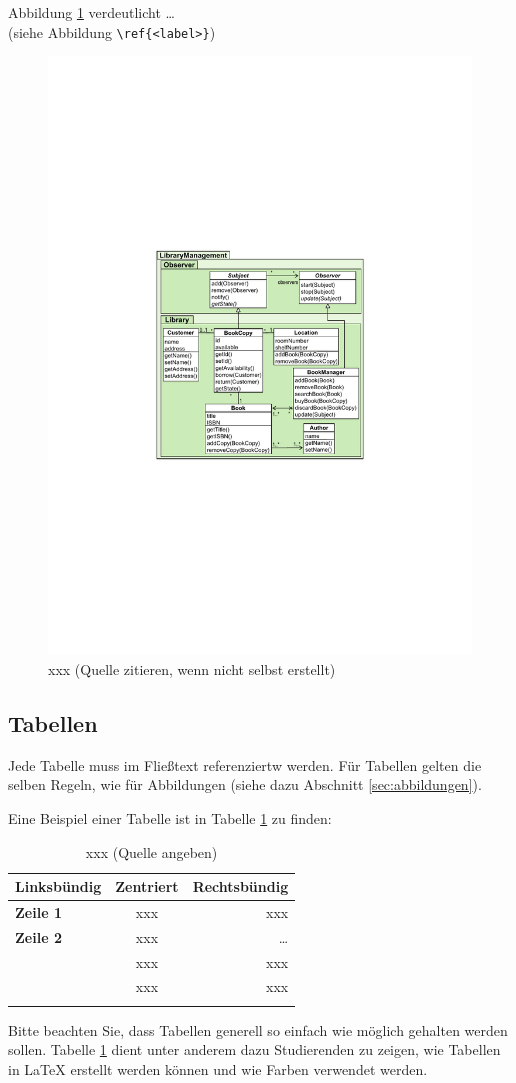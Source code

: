 Abbildung \ref{fig:xxx} verdeutlicht  \dots\\
(siehe Abbildung \verb|\ref{<label>}|)

\begin{figure}
	\centering
	\includegraphics[width=0.4\linewidth]{figures/figure1}
	\caption{xxx (Quelle zitieren, wenn nicht selbst erstellt)}
	\label{fig:xxx}
\end{figure}

\subsection{Tabellen}

Jede Tabelle muss im Fließtext referenziertw werden. Für Tabellen gelten die selben Regeln, wie für Abbildungen (siehe dazu Abschnitt \ref{sec:abbildungen}).

Eine Beispiel einer Tabelle ist in Tabelle \ref{tab:xxx} zu finden:
\begin{table}
	\centering
	\begin{tabular}{| >{\bfseries}l | c | r | }
		\hline
			\rowcolor{orange} \bfseries Linksbündig & \bfseries Zentriert & \bfseries Rechtsbündig \\
		\hline
		\hline
			Zeile 1 & xxx & xxx \\\hline
			Zeile 2 & xxx & \dots \\\hline
			\multirow{2}{*}{Zeile3}
			& xxx & xxx \\\cline{2-3}
			& xxx & xxx \\\hline
		\hline
			\multicolumn{3}{| c |}{xxx} \\\hline
	\end{tabular}
	\caption{xxx (Quelle angeben)}
	\label{tab:xxx}
\end{table}

Bitte beachten Sie, dass Tabellen generell so einfach wie möglich gehalten werden sollen. Tabelle \ref{tab:xxx} dient unter anderem dazu Studierenden zu zeigen, wie Tabellen in \LaTeX\xspace erstellt werden können und wie Farben verwendet werden.
